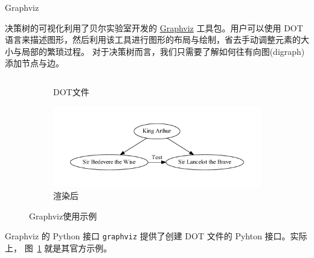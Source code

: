 \documentclass[10pt]{beamer}
\begin{document}
\begin{frame}[fragile]{Graphviz}

决策树的可视化利用了贝尔实验室开发的 \href{http://www.graphviz.org/}{Graphviz} 工具包。用户可以使用
DOT 语言来描述图形，然后利用该工具进行图形的布局与绘制，省去手动调整元素的大小与局部的繁琐过程。
对于决策树而言，我们只需要了解如何往有向图(digraph)添加节点与边。
\begin{figure}[!tbp]
  \begin{subfigure}[b]{0.48\textwidth}
    \inputminted[mathescape,breaklines,breakautoindent,fontsize=\tiny]{C}{./figures/graphviz_demo}
    \caption{DOT文件}
  \end{subfigure}
  \hfill
  \begin{subfigure}[b]{0.48\textwidth}
    \includegraphics[width=\textwidth]{./figures/graphviz_demo.pdf}
    \caption{渲染后}
  \end{subfigure}
  \caption{Graphviz使用示例}\label{fig:dot_demo}
\end{figure}

\end{frame}

\begin{frame}[fragile]{Graphviz 的 Python 接口}
\texttt{graphviz} 提供了创建 DOT 文件的 Pyhton 接口。实际上，
图~\ref{fig:dot_demo} 就是其官方示例。
\inputminted[mathescape,linenos,frame=lines,framesep=2mm,breaklines,breakautoindent,fontsize=\small]{python}{./codes/graphviz_demo.py}
\end{frame}
\end{document}
